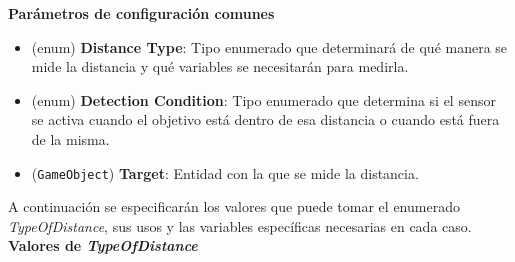 \textbf{Parámetros de configuración comunes}
\begin{itemize}
	\item (enum) \textbf{Distance Type}: Tipo enumerado que determinará de qué manera se mide la distancia y qué variables se necesitarán para medirla.
	\item (enum) \textbf{Detection Condition}: Tipo enumerado que determina si el sensor se activa cuando el objetivo está dentro de esa distancia o cuando está fuera de la misma.
	\item (\texttt{GameObject})\textbf{ Target}: Entidad con la que se mide la distancia.
\end{itemize}

A continuación se especificarán los valores que puede tomar el enumerado \textit{TypeOfDistance}, sus usos y las variables específicas necesarias en cada caso.\\

\textbf{Valores de \textit{TypeOfDistance}}

